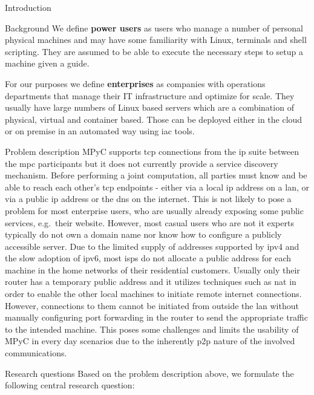 \begin{frame}{Introduction}
\begin{block}{Background}
We define \textbf{power users} as users who manage a number of personal
physical machines and may have some familiarity with Linux, terminals
and shell scripting. They are assumed to be able to execute the
necessary steps to setup a machine given a guide.

For our purposes we define \textbf{enterprises} as companies with
operations departments that manage their IT infrastructure and optimize
for scale. They usually have large numbers of Linux based servers which
are a combination of physical, virtual and container based. Those can be
deployed either in the cloud or on premise in an automated way using
\gls{iac} tools.
\end{block}

\begin{block}{Problem description}
\protect\hypertarget{problem-description}{}
MPyC supports \gls{tcp} connections from the \gls{ip} suite between the
\gls{mpc} participants but it does not currently provide a service
discovery mechanism. Before performing a joint computation, all parties
must know and be able to reach each other's \gls{tcp} endpoints - either
via a local \gls{ip} address on a \gls{lan}, or via a public \gls{ip}
address or the \gls{dns} on the internet. This is not likely to pose a
problem for most enterprise users, who are usually already exposing some
public services, e.g.~their website. However, most casual users who are
not \gls{it} experts typically do not own a domain name nor know how to
configure a publicly accessible server. Due to the limited supply of
addresses supported by \gls{ip}v4 and the slow adoption of \gls{ip}v6,
most \glspl{isp} do not allocate a public address for each machine in
the home networks of their residential customers. Usually only their
router has a temporary public address and it utilizes techniques such as
\gls{nat} in order to enable the other local machines to initiate remote
internet connections. However, connections to them cannot be initiated
from outside the \gls{lan} without manually configuring port forwarding
in the router to send the appropriate traffic to the intended machine.
This poses some challenges and limits the usability of MPyC in every day
scenarios due to the inherently \gls{p2p} nature of the involved
communications.
\end{block}

\begin{block}{Research questions}
\protect\hypertarget{research-questions}{}
Based on the problem description above, we formulate the following
central research question:


\end{block}
\end{frame}
